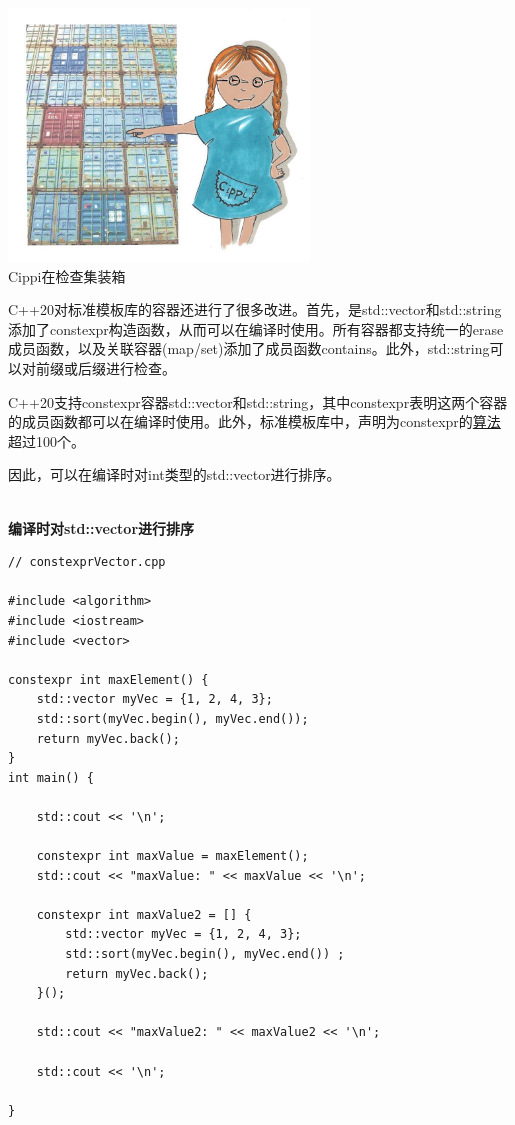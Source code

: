 \begin{center}
\includegraphics[width=0.6\textwidth]{content/3/chapter5/images/10.png}\\
Cippi在检查集装箱
\end{center}

C++20对标准模板库的容器还进行了很多改进。首先，是std::vector和std::string添加了constexpr构造函数，从而可以在编译时使用。所有容器都支持统一的erase成员函数，以及关联容器(map/set)添加了成员函数contains。此外，std::string可以对前缀或后缀进行检查。


C++20支持constexpr容器std::vector和std::string，其中constexpr表明这两个容器的成员函数都可以在编译时使用。此外，标准模板库中，声明为constexpr的\href{https://en.cppreference.com/w/cpp/algorithm}{算法}超过100个。

因此，可以在编译时对int类型的std::vector进行排序。

\hspace*{\fill} \\ %
\noindent
\textbf{编译时对std::vector进行排序}
\begin{lstlisting}[style=styleCXX]
// constexprVector.cpp

#include <algorithm>
#include <iostream>
#include <vector>

constexpr int maxElement() {
	std::vector myVec = {1, 2, 4, 3};
	std::sort(myVec.begin(), myVec.end());
	return myVec.back();
}
int main() {

	std::cout << '\n';
	
	constexpr int maxValue = maxElement();
	std::cout << "maxValue: " << maxValue << '\n';
	
	constexpr int maxValue2 = [] {
		std::vector myVec = {1, 2, 4, 3};
		std::sort(myVec.begin(), myVec.end()) ;
		return myVec.back();
	}();
	
	std::cout << "maxValue2: " << maxValue2 << '\n';
	
	std::cout << '\n';

}
\end{lstlisting}

